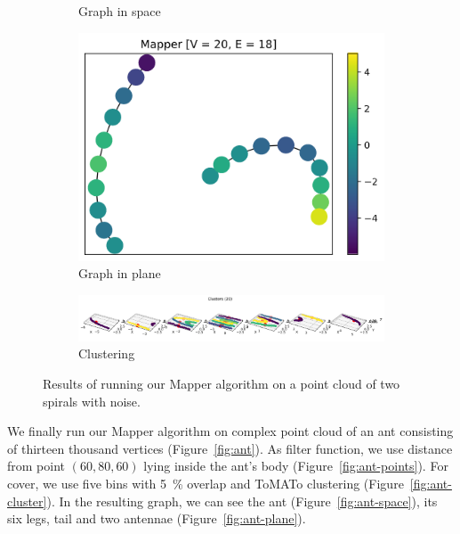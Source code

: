 \documentclass{article}
\begin{document}
\begin{figure}[ht]
\begin{subfigure}[c]{0.3\columnwidth}
        \caption{Graph in space}
        \label{fig:spirals-space}
    \end{subfigure}
    \begin{subfigure}[c]{0.3\columnwidth}
        \centering
        \includegraphics[width=\textwidth]{spirals-graph-2d}
        \caption{Graph in plane}
        \label{fig:spirals-plane}
    \end{subfigure}
    \begin{subfigure}[c]{0.9\columnwidth}
        \centering
        \includegraphics[width=\textwidth]{spirals-clusters}
        \caption{Clustering}
        \label{fig:spirals-cluster}
    \end{subfigure}
    \caption{Results of running our Mapper algorithm on a point cloud of two spirals with noise.}
    \label{fig:spirals}
\end{figure}

We finally run our Mapper algorithm on complex point cloud of an ant consisting of thirteen thousand vertices (Figure~\ref{fig:ant}).
As filter function, we use distance from point $(60, 80, 60)$ lying inside the ant's body (Figure~\ref{fig:ant-points}).
For cover, we use five bins with 5~\% overlap and ToMATo clustering (Figure~\ref{fig:ant-cluster}).
In the resulting graph, we can see the ant (Figure~\ref{fig:ant-space}), its six legs, tail and two antennae (Figure~\ref{fig:ant-plane}).
\end{document}
